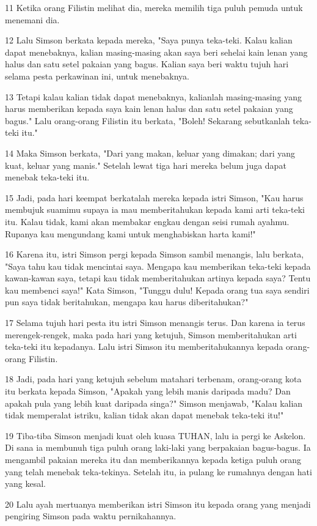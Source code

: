 \par 11 Ketika orang Filistin melihat dia, mereka memilih tiga puluh pemuda untuk menemani dia.
\par 12 Lalu Simson berkata kepada mereka, "Saya punya teka-teki. Kalau kalian dapat menebaknya, kalian masing-masing akan saya beri sehelai kain lenan yang halus dan satu setel pakaian yang bagus. Kalian saya beri waktu tujuh hari selama pesta perkawinan ini, untuk menebaknya.
\par 13 Tetapi kalau kalian tidak dapat menebaknya, kalianlah masing-masing yang harus memberikan kepada saya kain lenan halus dan satu setel pakaian yang bagus." Lalu orang-orang Filistin itu berkata, "Boleh! Sekarang sebutkanlah teka-teki itu."
\par 14 Maka Simson berkata, "Dari yang makan, keluar yang dimakan; dari yang kuat, keluar yang manis." Setelah lewat tiga hari mereka belum juga dapat menebak teka-teki itu.
\par 15 Jadi, pada hari keempat berkatalah mereka kepada istri Simson, "Kau harus membujuk suamimu supaya ia mau memberitahukan kepada kami arti teka-teki itu. Kalau tidak, kami akan membakar engkau dengan seisi rumah ayahmu. Rupanya kau mengundang kami untuk menghabiskan harta kami!"
\par 16 Karena itu, istri Simson pergi kepada Simson sambil menangis, lalu berkata, "Saya tahu kau tidak mencintai saya. Mengapa kau memberikan teka-teki kepada kawan-kawan saya, tetapi kau tidak memberitahukan artinya kepada saya? Tentu kau membenci saya!" Kata Simson, "Tunggu dulu! Kepada orang tua saya sendiri pun saya tidak beritahukan, mengapa kau harus diberitahukan?"
\par 17 Selama tujuh hari pesta itu istri Simson menangis terus. Dan karena ia terus merengek-rengek, maka pada hari yang ketujuh, Simson memberitahukan arti teka-teki itu kepadanya. Lalu istri Simson itu memberitahukannya kepada orang-orang Filistin.
\par 18 Jadi, pada hari yang ketujuh sebelum matahari terbenam, orang-orang kota itu berkata kepada Simson, "Apakah yang lebih manis daripada madu? Dan apakah pula yang lebih kuat daripada singa?" Simson menjawab, "Kalau kalian tidak memperalat istriku, kalian tidak akan dapat menebak teka-teki itu!"
\par 19 Tiba-tiba Simson menjadi kuat oleh kuasa TUHAN, lalu ia pergi ke Askelon. Di sana ia membunuh tiga puluh orang laki-laki yang berpakaian bagus-bagus. Ia mengambil pakaian mereka itu dan memberikannya kepada ketiga puluh orang yang telah menebak teka-tekinya. Setelah itu, ia pulang ke rumahnya dengan hati yang kesal.
\par 20 Lalu ayah mertuanya memberikan istri Simson itu kepada orang yang menjadi pengiring Simson pada waktu pernikahannya.

